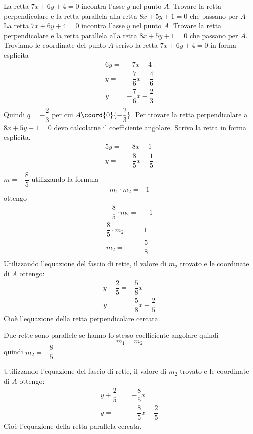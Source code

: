 \begin{exercise}
	La retta $7x+6y+4=0$ incontra l'asse $y$ nel punto $A$. Trovare la retta perpendicolare e la retta parallela alla retta $8x+5y+1=0$ che passano per $A$
	\tcblower
	La retta $7x+6y+4=0$ incontra l'asse $y$ nel punto $A$. Trovare la retta perpendicolare e la retta parallela alla retta $8x+5y+1=0$ che passano per $A$.
	Troviamo le coordinate del punto $A$ scrivo la retta  $7x+6y+4=0$ in forma esplicita
	\begin{align*}
	6y=&-7x-4\\
	y=&-\dfrac{7}{6}x-\dfrac{4}{6}\\
	y=&-\dfrac{7}{6}x-\dfrac{2}{3}\\
	\end{align*}
	Quindi $q=-\dfrac{2}{3}$ per cui $A\coord{0}{-\dfrac{2}{3}}$. Per trovare la retta perpendicolare a $8x+5y+1=0$ devo calcolarne il coefficiente angolare.
	Scrivo la retta in forma esplicita.
		\begin{align*}
		5y=&-8x-1\\
		y=&-\dfrac{8}{5}x-\dfrac{1}{5}\\
		\end{align*}
	$m=-\dfrac{8}{5}$ utilizzando la formula \[m_1\cdot m_2=-1\] ottengo
	\begin{align*}
-\dfrac{8}{5}\cdot m_2=&-1\\
\dfrac{8}{5}\cdot m_2=&1\\
 m_2=&\dfrac{5}{8}\\
	\end{align*}
	Utilizzando l'equazione del fascio di rette, il valore di $m_2$ trovato e le coordinate di $A$ ottengo:
	\begin{align*}
	y+\dfrac{2}{5}=&\dfrac{5}{8}x\\
		y=&\dfrac{5}{8}x-\dfrac{2}{5}
	\end{align*}
	Cioè l'equazione della retta perpendicolare cercata.
	
	Due rette sono parallele se hanno lo stesso coefficiente angolare quindi \[m_1=m_2 \]
	quindi $m_2=-\dfrac{8}{5}$ 
	
	Utilizzando l'equazione del fascio di rette, il valore di $m_2$ trovato e le coordinate di $A$ ottengo:
		\begin{align*}
		y+\dfrac{2}{5}=&-\dfrac{8}{5}x\\
		y=&-\dfrac{8}{5}x-\dfrac{2}{5}
		\end{align*}
	Cioè l'equazione della retta parallela cercata.		
	\begin{center}

\end{center}
\end{exercise}
